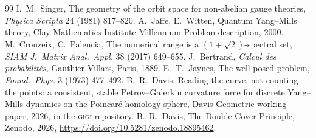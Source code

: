 \documentclass[11pt]{article}
\begin{document}
\begin{thebibliography}{99}
 I.~M.~Singer, The geometry of the orbit space for non-abelian gauge theories, \emph{Physica Scripta} 24 (1981) 817--820.
 A.~Jaffe, E.~Witten, Quantum Yang--Mills theory, Clay Mathematics Institute Millennium Problem description, 2000.
 M.~Crouzeix, C.~Palencia, The numerical range is a $(1+\sqrt2)$-spectral set, \emph{SIAM J.\ Matrix Anal.\ Appl.} 38 (2017) 649--655.
 J.~Bertrand, \emph{Calcul des probabilit\'es}, Gauthier-Villars, Paris, 1889.
 E.~T.~Jaynes, The well-posed problem, \emph{Found.\ Phys.} 3 (1973) 477--492.
 B.~R.~Davis, Reading the curve, not counting the points: a consistent,
stable Petrov--Galerkin curvature force for discrete Yang--Mills dynamics on the Poincar\'e
homology sphere, Davis Geometric working paper, 2026,
 in the \textsc{gigi} repository.
 B.~R.~Davis, The Double Cover Principle, Zenodo, 2026, \url{https://doi.org/10.5281/zenodo.18895462}.
\end{thebibliography}
\end{document}
